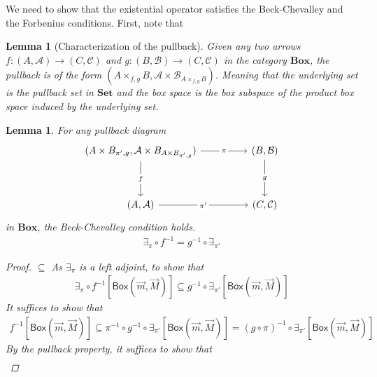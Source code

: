 \documentclass[12pt]{article}
\newtheorem{lemma}[theorem]{Lemma}
\newcommand{\bobject}{\mathsf{Box}}
\begin{document}
We need to show
that the existential operator satisfies the Beck-Chevalley
and the Forbenius conditions.
First, note that
\begin{lemma}[Characterization of the pullback]\label{lem:box-pullback}
    Given any two arrows $f:(A,\mathcal{A})\to(C,\mathcal{C})$
    and $g:(B,\mathcal{B})\to(C,\mathcal{C})$ in the category $\mathbf{Box}$,
    the pullback is of the form
    $(A\times_{f,g} B,\mathcal{A\times B}_{A\times_{f,g} B})$. Meaning that 
    the underlying set is the pullback set in $\mathbf{Set}$
    and the box space is the box subspace of the product box space induced
    by the underlying set.
\end{lemma}
\begin{lemma}
    For any pullback diagram
    \[\begin{tikzcd}
        {(A\times B_{\pi',g},\mathcal{A}\times B_{A\times B_{\pi',g}})} && {(B,\mathcal{B})} \\
        \\
        {(A,\mathcal{A})} && {(C,\mathcal{C})}
        \arrow["\pi"{description}, from=1-1, to=1-3]
        \arrow["g"{description}, from=1-3, to=3-3]
        \arrow["f"{description}, from=1-1, to=3-1]
        \arrow["{\pi'}"{description}, from=3-1, to=3-3]
    \end{tikzcd}\]
    in $\mathbf{Box}$, the Beck-Chevalley condition holds.
    \begin{gather*}
        \exists_\pi\circ f^{-1}=g^{-1}\circ\exists_{\pi'}
    \end{gather*}
    \begin{proof}
        $\subseteq$
        As $\exists_\pi$ is a left adjoint, to show that
        \begin{gather*}
            \exists_\pi\circ f^{-1}[\bobject(\vec{m},\vec{M})]
            \subseteq
            g^{-1}\circ\exists_{\pi'}[\bobject(\vec{m},\vec{M})]
        \end{gather*}
        It suffices to show that
        \begin{gather*}
            f^{-1}[\bobject(\vec{m},\vec{M})]
            \subseteq
            \pi^{-1}\circ g^{-1}\circ\exists_{\pi'}[\bobject(\vec{m},\vec{M})]=(g\circ\pi)^{-1}\circ\exists_{\pi'}[\bobject(\vec{m},\vec{M})]
        \end{gather*}
        By the pullback property, it suffices to show that
        \begin{gather*}

\end{gather*}
\end{proof}
\end{lemma}
\end{document}
